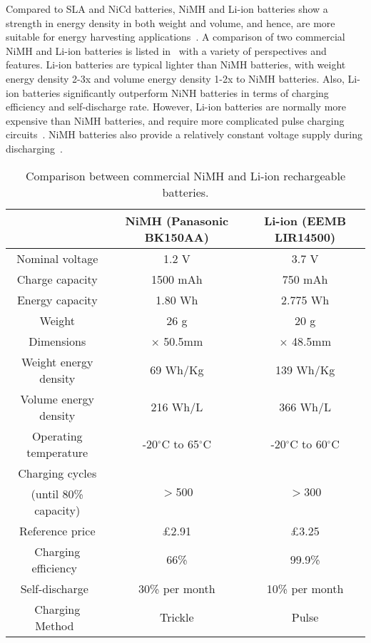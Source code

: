 Compared to SLA and NiCd batteries, NiMH and Li-ion batteries show a strength in energy density in both weight and volume, and hence, are more suitable for energy harvesting applications~\cite{raghunathan2005design, taneja2008design, akhtar2015energy, prauzek2018energy}. 
A comparison of two commercial NiMH and Li-ion batteries is listed in~ with a variety of perspectives and features. 
Li-ion batteries are typical lighter than NiMH batteries, with weight energy density 2-3x and volume energy density 1-2x to NiMH batteries. 
Also, Li-ion batteries significantly outperform NiNH batteries in terms of charging efficiency and self-discharge rate. 
However, Li-ion batteries are normally more expensive than NiMH batteries, and require more complicated pulse charging circuits~\cite{raghunathan2005design}. 
NiMH batteries also provide a relatively constant voltage supply during discharging~\cite{kansal2007power}. 

\begin{table}
    \renewcommand{\arraystretch}{1.2}
    \centering
    \begin{tabular}{|c|c|c|}
    \hline
     & NiMH (Panasonic BK150AA) & Li-ion (EEMB LIR14500) \\
    \hline
    Nominal voltage & 1.2 V & 3.7 V \\
    Charge capacity & 1500 mAh & 750 mAh \\
    Energy capacity & 1.80 Wh & 2.775 Wh \\
    Weight & 26 g & 20 g \\
    Dimensions & \diameter14.5mm $\times$ 50.5mm & \diameter14.1mm $\times$ 48.5mm \\
    Weight energy density & 69 Wh/Kg & 139 Wh/Kg \\
    Volume energy density & 216 Wh/L & 366 Wh/L \\
    Operating temperature & -20$^\circ$C to 65$^\circ$C & -20$^\circ$C to 60$^\circ$C \\
    Charging cycles & \multirow{2}{*}{$>$500} & \multirow{2}{*}{$>$300} \\
    (until 80\% capacity) & & \\
    Reference price & £2.91 & £3.25 \\ 
    Charging efficiency~\cite{prauzek2018energy} & 66\% & 99.9\% \\
    Self-discharge~\cite{prauzek2018energy} & 30\% per month & 10\% per month \\
    Charging Method~\cite{prauzek2018energy} & Trickle & Pulse \\
    \hline
    \end{tabular}
    \caption{Comparison between commercial NiMH and Li-ion rechargeable batteries.}
    \label{Table:nimhliion}
\end{table}

